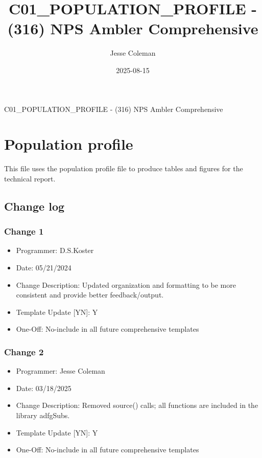 \documentclass[
]{article}
\title{C01\_POPULATION\_PROFILE - (316) NPS Ambler Comprehensive}
\author{Jesse Coleman}
\date{2025-08-15}
\providecommand{\tightlist}{%
  \setlength{\itemsep}{0pt}\setlength{\parskip}{0pt}}
\begin{document}
\maketitle

C01\_POPULATION\_PROFILE - (316) NPS Ambler Comprehensive

\section{Population profile}\label{population-profile}

This file uses the population profile file to produce tables and figures
for the technical report.

\subsection{Change log}\label{change-log}

\subsubsection{Change 1}\label{change-1}

\begin{itemize}
\tightlist
\item
  Programmer: D.S.Koster\\
\item
  Date: 05/21/2024\\
\item
  Change Description: Updated organization and formatting to be more
  consistent and provide better feedback/output.\\
\item
  Template Update {[}Y\textbar N{]}: Y\\
\item
  One-Off: No-include in all future comprehensive templates
\end{itemize}

\subsubsection{Change 2}\label{change-2}

\begin{itemize}
\tightlist
\item
  Programmer: Jesse Coleman
\item
  Date: 03/18/2025
\item
  Change Description: Removed source() calls; all functions are included
  in the library adfgSubs.
\item
  Template Update {[}Y\textbar N{]}: Y
\item
  One-Off: No-include in all future comprehensive templates
\end{itemize}
\end{document}
